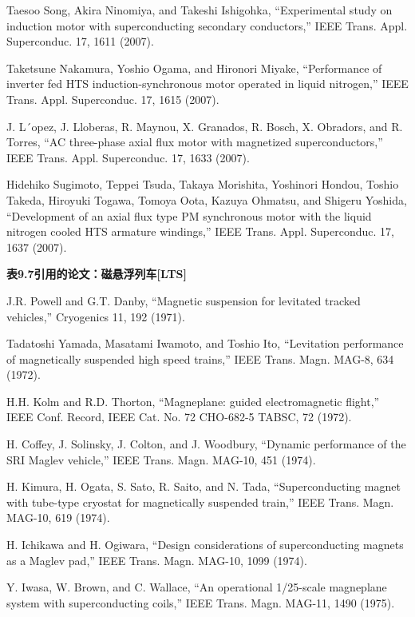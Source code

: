 \noindent [9.230] Taesoo Song, Akira Ninomiya, and Takeshi Ishigohka, ``Experimental study on
induction motor with superconducting secondary conductors,” IEEE Trans. Appl.
Superconduc. 17, 1611 (2007).

\noindent [9.231] Taketsune Nakamura, Yoshio Ogama, and Hironori Miyake, ``Performance of inverter
fed HTS induction-synchronous motor operated in liquid nitrogen,” IEEE
Trans. Appl. Superconduc. 17, 1615 (2007).

\noindent [9.232] J. L´opez, J. Lloberas, R. Maynou, X. Granados, R. Bosch, X. Obradors, and
R. Torres, ``AC three-phase axial flux motor with magnetized superconductors,”
IEEE Trans. Appl. Superconduc. 17, 1633 (2007).

\noindent [9.233] Hidehiko Sugimoto, Teppei Tsuda, Takaya Morishita, Yoshinori Hondou, Toshio
Takeda, Hiroyuki Togawa, Tomoya Oota, Kazuya Ohmatsu, and Shigeru Yoshida,
``Development of an axial flux type PM synchronous motor with the liquid nitrogen
cooled HTS armature windings,” IEEE Trans. Appl. Superconduc. 17, 1637
(2007).

\noindent \textbf{表9.7引用的论文：磁悬浮列车[LTS] }

\noindent [9.234] J.R. Powell and G.T. Danby, ``Magnetic suspension for levitated tracked vehicles,”
Cryogenics 11, 192 (1971).

\noindent [9.235] Tadatoshi Yamada, Masatami Iwamoto, and Toshio Ito, ``Levitation performance
of magnetically suspended high speed trains,” IEEE Trans. Magn. MAG-8, 634
(1972).

\noindent [9.236] H.H. Kolm and R.D. Thorton, ``Magneplane: guided electromagnetic flight,” IEEE
Conf. Record, IEEE Cat. No. 72 CHO-682-5 TABSC, 72 (1972).

\noindent [9.237] H. Coffey, J. Solinsky, J. Colton, and J. Woodbury, ``Dynamic performance of the
SRI Maglev vehicle,” IEEE Trans. Magn. MAG-10, 451 (1974).

\noindent [9.238] H. Kimura, H. Ogata, S. Sato, R. Saito, and N. Tada, ``Superconducting magnet
with tube-type cryostat for magnetically suspended train,” IEEE Trans. Magn.
MAG-10, 619 (1974).

\noindent [9.239] H. Ichikawa and H. Ogiwara, ``Design considerations of superconducting magnets
as a Maglev pad,” IEEE Trans. Magn. MAG-10, 1099 (1974).

\noindent [9.240] Y. Iwasa, W. Brown, and C. Wallace, ``An operational 1/25-scale magneplane
system with superconducting coils,” IEEE Trans. Magn. MAG-11, 1490 (1975).

